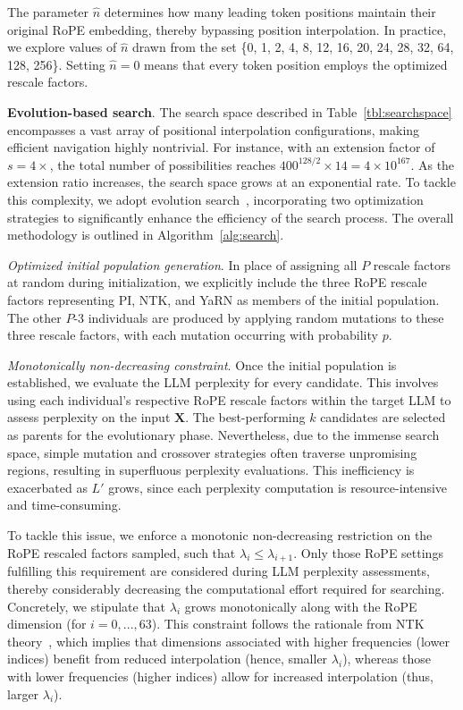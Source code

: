 The parameter $\hat{n}$ determines how many leading token positions maintain their original RoPE embedding, thereby bypassing position interpolation. In practice, we explore values of $\hat{n}$ drawn from the set \{0, 1, 2, 4, 8, 12, 16, 20, 24, 28, 32, 64, 128, 256\}. Setting $\hat{n}=0$ means that every token position employs the optimized rescale factors.

\textbf{Evolution-based search}. The search space described in Table~\ref{tbl:searchspace} encompasses a vast array of positional interpolation configurations, making efficient navigation highly nontrivial. For instance, with an extension factor of $s=4\times$, the total number of possibilities reaches $400^{128/2}\times14 = 4\times10^{167}$. As the extension ratio increases, the search space grows at an exponential rate. To tackle this complexity, we adopt evolution search~\cite{guo2020single}, incorporating two optimization strategies to significantly enhance the efficiency of the search process. The overall methodology is outlined in Algorithm~\ref{alg:search}.

\textit{Optimized initial population generation}. In place of assigning all $P$ rescale factors at random during initialization, we explicitly include the three RoPE rescale factors representing PI, NTK, and YaRN as members of the initial population. The other $P$-3 individuals are produced by applying random mutations to these three rescale factors, with each mutation occurring with probability $p$.

\textit{Monotonically non-decreasing constraint}. Once the initial population is established, we evaluate the LLM perplexity for every candidate. This involves using each individual’s respective RoPE rescale factors within the target LLM to assess perplexity on the input $\mathbf{X}$. The best-performing $k$ candidates are selected as parents for the evolutionary phase. Nevertheless, due to the immense search space, simple mutation and crossover strategies often traverse unpromising regions, resulting in superfluous perplexity evaluations. This inefficiency is exacerbated as $L'$ grows, since each perplexity computation is resource-intensive and time-consuming.

To tackle this issue, we enforce a monotonic non-decreasing restriction on the RoPE rescaled factors sampled, such that $\lambda_i\le \lambda_{i+1}$. Only those RoPE settings fulfilling this requirement are considered during LLM perplexity assessments, thereby considerably decreasing the computational effort required for searching. Concretely, we stipulate that $\lambda_i$ grows monotonically along with the RoPE dimension (for $i=0,...,63$). This constraint follows the rationale from NTK theory~\cite{jacot2018neural,tancik2020fourier,ntk}, which implies that dimensions associated with higher frequencies (lower indices) benefit from reduced interpolation (hence, smaller $\lambda_i$), whereas those with lower frequencies (higher indices) allow for increased interpolation (thus, larger $\lambda_i$).

